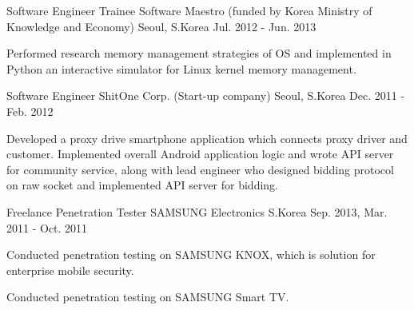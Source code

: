 \begin{cventries}
  \cventry
  {Software Engineer Trainee} %
  {Software Maestro (funded by Korea Ministry of Knowledge and Economy)} %
  {Seoul, S.Korea} %
  {Jul. 2012 - Jun. 2013} %
  {
    \begin{cvitems} %
    \item {Performed research memory management strategies of OS and implemented in Python an interactive simulator for Linux kernel memory management.}
    \end{cvitems}
  }

  \cventry
  {Software Engineer} %
  {ShitOne Corp. (Start-up company)} %
  {Seoul, S.Korea} %
  {Dec. 2011 - Feb. 2012} %
  {
    \begin{cvitems} %
    \item {Developed a proxy drive smartphone application which connects proxy driver and customer. Implemented overall Android application logic and wrote API server for community service, along with lead engineer who designed bidding protocol on raw socket and implemented API server for bidding.}
    \end{cvitems}
  }

  \cventry
  {Freelance Penetration Tester} %
  {SAMSUNG Electronics} %
  {S.Korea} %
  {Sep. 2013, Mar. 2011 - Oct. 2011} %
  {
    \begin{cvitems} %
    \item {Conducted penetration testing on SAMSUNG KNOX, which is solution for enterprise mobile security.}
    \item {Conducted penetration testing on SAMSUNG Smart TV.}
    \end{cvitems}
  }

\end{cventries}
